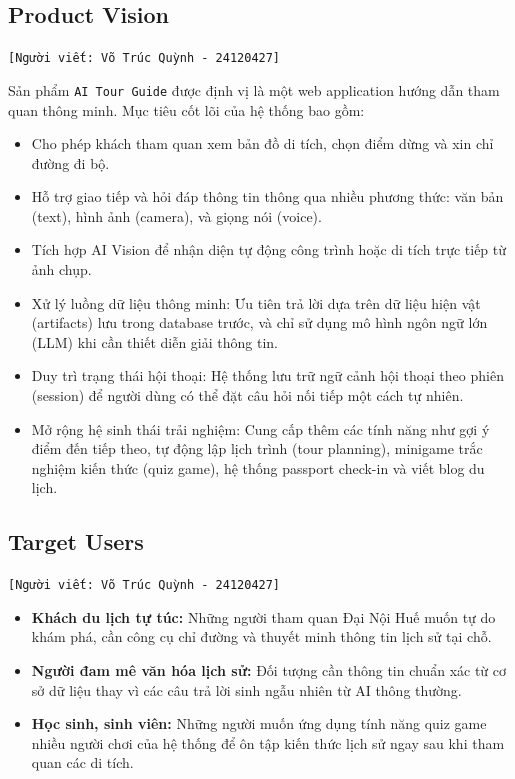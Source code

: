 \subsection{Product Vision}
\texttt{[Người viết: Võ Trúc Quỳnh - 24120427]}

Sản phẩm \texttt{AI Tour Guide} được định vị là một web application hướng dẫn tham quan thông minh. Mục tiêu cốt lõi của hệ thống bao gồm:
\begin{itemize}
    \item Cho phép khách tham quan xem bản đồ di tích, chọn điểm dừng và xin chỉ đường đi bộ.
    \item Hỗ trợ giao tiếp và hỏi đáp thông tin thông qua nhiều phương thức: văn bản (text), hình ảnh (camera), và giọng nói (voice).
    \item Tích hợp AI Vision để nhận diện tự động công trình hoặc di tích trực tiếp từ ảnh chụp.
    \item Xử lý luồng dữ liệu thông minh: Ưu tiên trả lời dựa trên dữ liệu hiện vật (artifacts) lưu trong database trước, và chỉ sử dụng mô hình ngôn ngữ lớn (LLM) khi cần thiết diễn giải thông tin. 
    \item Duy trì trạng thái hội thoại: Hệ thống lưu trữ ngữ cảnh hội thoại theo phiên (session) để người dùng có thể đặt câu hỏi nối tiếp một cách tự nhiên.
    \item Mở rộng hệ sinh thái trải nghiệm: Cung cấp thêm các tính năng như gợi ý điểm đến tiếp theo, tự động lập lịch trình (tour planning), minigame trắc nghiệm kiến thức (quiz game), hệ thống passport check-in và viết blog du lịch.
\end{itemize}

\subsection{Target Users}
\texttt{[Người viết: Võ Trúc Quỳnh - 24120427]}

\begin{itemize}
    \item \textbf{Khách du lịch tự túc:} Những người tham quan Đại Nội Huế muốn tự do khám phá, cần công cụ chỉ đường và thuyết minh thông tin lịch sử tại chỗ.
    \item \textbf{Người đam mê văn hóa lịch sử:} Đối tượng cần thông tin chuẩn xác từ cơ sở dữ liệu thay vì các câu trả lời sinh ngẫu nhiên từ AI thông thường.
    \item \textbf{Học sinh, sinh viên:} Những người muốn ứng dụng tính năng quiz game nhiều người chơi của hệ thống để ôn tập kiến thức lịch sử ngay sau khi tham quan các di tích.
\end{itemize}


